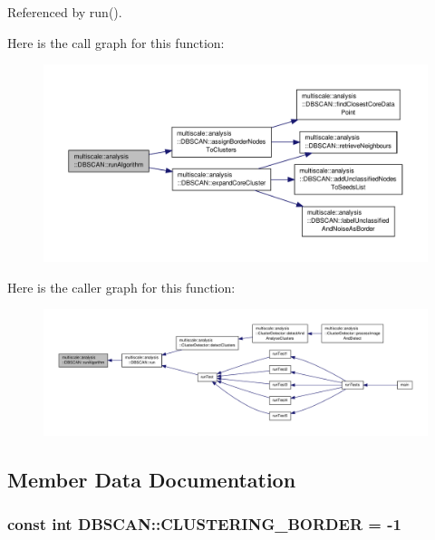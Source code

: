 Referenced by run().



Here is the call graph for this function\-:
\nopagebreak
\begin{figure}[H]
\begin{center}
\leavevmode
\includegraphics[width=350pt]{classmultiscale_1_1analysis_1_1DBSCAN_aceb5dd9fe24a24cbf09ddc9082dc1f82_cgraph}
\end{center}
\end{figure}




Here is the caller graph for this function\-:
\nopagebreak
\begin{figure}[H]
\begin{center}
\leavevmode
\includegraphics[width=350pt]{classmultiscale_1_1analysis_1_1DBSCAN_aceb5dd9fe24a24cbf09ddc9082dc1f82_icgraph}
\end{center}
\end{figure}




\subsection{Member Data Documentation}
\hypertarget{classmultiscale_1_1analysis_1_1DBSCAN_a28f37ffc029ccd1d121cbc4467851ce2}{
\subsubsection[{C\-L\-U\-S\-T\-E\-R\-I\-N\-G\-\_\-\-B\-O\-R\-D\-E\-R}]{\setlength{\rightskip}{0pt plus 5cm}const int D\-B\-S\-C\-A\-N\-::\-C\-L\-U\-S\-T\-E\-R\-I\-N\-G\-\_\-\-B\-O\-R\-D\-E\-R = -\/1\hspace{0.3cm}{\ttfamily [static]}}}\label{classmultiscale_1_1analysis_1_1DBSCAN_a28f37ffc029ccd1d121cbc4467851ce2}


